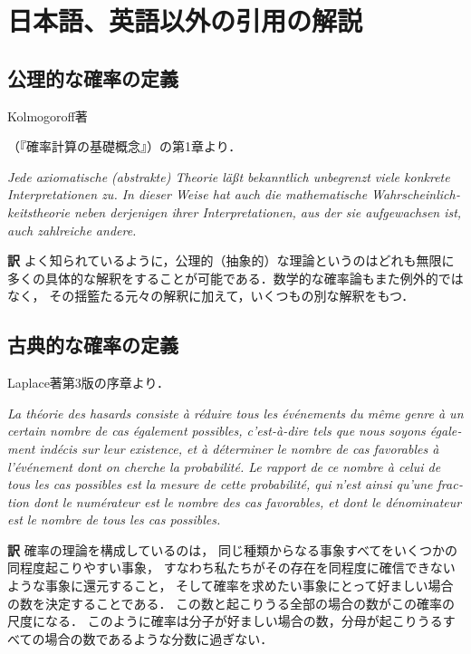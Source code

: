 \documentclass[main.tex]{subfiles}
\begin{document}
\chapter{日本語、英語以外の引用の解説}

\section{公理的な確率の定義}

Kolmogoroff著\begin{german}\end{german}（『確率計算の基礎概念』）の第1章より．

\begin{quotebox}
\begin{german}{\itshape
Jede axiomatische (abstrakte) Theorie läßt
bekanntlich unbegrenzt viele konkrete Interpretationen zu.
In dieser Weise hat auch die mathematische Wahrscheinlichkeitstheorie
neben derjenigen ihrer Interpretationen,
aus der sie aufgewachsen ist,
auch zahlreiche andere.}
\end{german}
\end{quotebox}

\noindent \textbf{\gtfamily 訳} よく知られているように，公理的（抽象的）な理論というのはどれも無限に多くの具体的な解釈をすることが可能である．数学的な確率論もまた例外的ではなく，
その揺籃たる元々の解釈に加えて，いくつもの別な解釈をもつ．



\section{古典的な確率の定義}

Laplace著第3版の序章より．

\begin{quotebox}
\begin{french}
{\itshape
La théorie des hasards consiste à réduire tous les événements du même genre à un certain nombre
de cas également possibles, c'est-à-dire tels que nous soyons également indécis sur leur existence,
et à déterminer le nombre de cas favorables à l'événement dont on cherche la probabilité.
Le rapport de ce nombre à celui de tous les cas possibles est la mesure de cette probabilité,
qui n'est ainsi qu'une fraction dont le numérateur est le nombre des cas favorables,
et dont le dénominateur est le nombre de tous les cas possibles.}
\end{french}
\end{quotebox}

\noindent \textbf{\gtfamily 訳} 確率の理論を構成しているのは，
同じ種類からなる事象すべてをいくつかの同程度起こりやすい事象，
すなわち私たちがその存在を同程度に確信できないような事象に還元すること，
そして確率を求めたい事象にとって好ましい場合の数を決定することである．
この数と起こりうる全部の場合の数がこの確率の尺度になる．
このように確率は分子が好ましい場合の数，分母が起こりうるすべての場合の数であるような分数に過ぎない．


\end{document}
